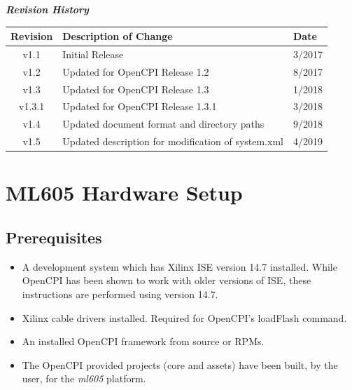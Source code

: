 \maketitle
\newpage
	\begin{center}
	\textit{\textbf{Revision History}}
		\begin{table}[H]
		\label{table:revisions} %
			\begin{tabularx}{\textwidth}{|c|X|l|}
			\hline
			\rowcolor{blue}
			\textbf{Revision} & \textbf{Description of Change} & \textbf{Date} \\
		    \hline
		    v1.1 & Initial Release & 3/2017 \\
		    \hline
		    v1.2 & Updated for OpenCPI Release 1.2 & 8/2017 \\
			\hline
			v1.3 & Updated for OpenCPI Release 1.3 & 1/2018 \\
			\hline
			v1.3.1 & Updated for OpenCPI Release 1.3.1 & 3/2018 \\
			\hline
			v1.4 & Updated document format and directory paths & 9/2018 \\
			\hline
			v1.5 & Updated description for modification of system.xml & 4/2019\\
			\hline
			\end{tabularx}
		\end{table}
	\end{center}
\newpage
\tableofcontents
\pagebreak
\section{ML605 Hardware Setup}
\subsection{Prerequisites}
\begin{itemize}
	\item A development system which has Xilinx ISE version 14.7 installed. While OpenCPI has been shown to work with older versions of ISE, these instructions are performed using version 14.7.
	\item Xilinx cable drivers installed. Required for OpenCPI's loadFlash command.
	\item An installed OpenCPI framework from source or RPMs.
	\item The OpenCPI provided projects (core and assets) have been built, by the user, for the \textit{ml605} platform.
\end{itemize}

